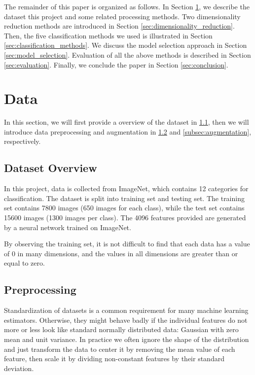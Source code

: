 \documentclass[10pt,journal,compsoc]{IEEEtran}
\begin{document}
The remainder of this paper is organized as follows. In Section \ref{sec:data}, we describe the dataset this project and some related processing methods. Two dimensionality reduction methods are introduced in Section \ref{sec:dimensionality_reduction}. Then, the five classification methods we used is illustrated in Section \ref{sec:classification_methods}. We discuss the model selection approach in Section \ref{sec:model_selection}. Evaluation of all the above methods is described in Section \ref{sec:evaluation}. Finally, we conclude the paper in Section \ref{sec:conclusion}.


\section{Data}
\label{sec:data}
In this section, we will first provide a overview of the dataset in \ref{subsec:dataset_overview}, then we will introduce data preprocessing and augmentation in \ref{subsec:preprocessing} and \ref{subsec:augmentation}, respectively.

\subsection{Dataset Overview}
\label{subsec:dataset_overview}
In this project, data is collected from ImageNet, which contains 12 categories for classification. The dataset is split into training set and testing set. The training set contains 7800 images (650 images for each class), while the test set contains 15600 images (1300 images per class). The 4096 features provided are generated by a neural network trained on ImageNet.

By observing the training set, it is not difficult to find that each data has a value of 0 in many dimensions, and the values in all dimensions are greater than or equal to zero.

\subsection{Preprocessing}
\label{subsec:preprocessing}
Standardization of datasets is a common requirement for many machine learning estimators. Otherwise, they might behave badly if the individual features do not more or less look like standard normally distributed data: Gaussian with zero mean and unit variance. In practice we often ignore the shape of the distribution and just transform the data to center it by removing the mean value of each feature, then scale it by dividing non-constant features by their standard deviation.
\end{document}

